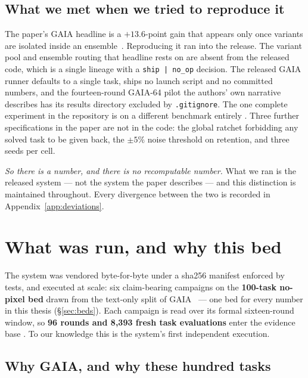 \subsection*{What we met when we tried to reproduce it}

The paper's GAIA headline is a $+13.6$-point gain that appears only once
variants are isolated inside an ensemble~\cite{aegis}. Reproducing it ran
into the release. The variant pool and
ensemble routing that headline rests on are absent from the released code,
which is a single lineage with a \texttt{ship\,|\,no\_op} decision. The
released GAIA runner defaults to a single task, ships no launch script and
no committed numbers, and the fourteen-round GAIA-64 pilot the authors'
own narrative describes has its results directory excluded by
\texttt{.gitignore}. The one complete experiment in the repository is on a
different benchmark entirely . Three further specifications in the
paper are not in the code: the global ratchet forbidding any solved task to
be given back, the $\pm 5\%$ noise threshold on retention, and three seeds
per cell.

\emph{So there is a number, and there is no recomputable number.} What we
ran is the released system --- not the system the paper describes --- and
this distinction is maintained throughout. Every divergence between the two
is recorded in Appendix~\ref{app:deviations}.

\section{What was run, and why this bed}
\label{sec:what-was-run}

The system was vendored byte-for-byte under a sha256 manifest enforced by
tests, and executed at scale: six claim-bearing campaigns on the
\textbf{100-task no-pixel bed} drawn from the text-only split of
GAIA~\cite{gaia} --- one bed for every number in this thesis
(\S\ref{sec:beds}).
Each campaign is read over its formal sixteen-round window, so
\textbf{96 rounds and 8{,}393 fresh task evaluations} enter the evidence
base . To our knowledge this is the system's first independent execution.

\subsection*{Why GAIA, and why these hundred tasks}

